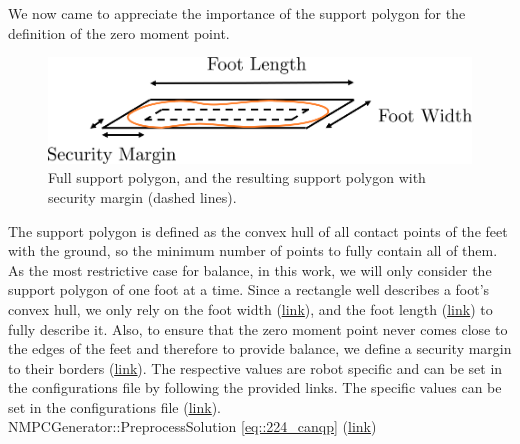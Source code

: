 We now came to appreciate the importance of the support polygon for the definition of the zero moment point. 
\begin{figure}[h!]
	\centering
	\includegraphics[scale=.5]{chapters/02_foundations_for_humanoid_walking/img/support_polygon.png}
	\caption{Full support polygon, and the resulting support polygon with security margin (dashed lines).}
	\label{fig::62_support_polygon}
\end{figure}
The support polygon is defined as the convex hull of all contact points of the feet with the ground, so the minimum number of points to fully contain all of them. As the most restrictive case for balance, in this work, we will only consider the support polygon of one foot at a time. Since a rectangle well describes a foot's convex hull, we only rely on the foot width (\href{https://github.com/mhubii/nmpc_pattern_generator/blob/bc79a6d4f9bcfd3794146355af44429f5b7a9fe0/libs/pattern_generator/configs.yaml#L14}{\underline{link}}), and the foot length (\href{https://github.com/mhubii/nmpc_pattern_generator/blob/bc79a6d4f9bcfd3794146355af44429f5b7a9fe0/libs/pattern_generator/configs.yaml#L15}{\underline{link}}) to fully describe it. Also, to ensure that the zero moment point never comes close to the edges of the feet and therefore to provide balance, we define a security margin to their borders (\href{https://github.com/mhubii/nmpc_pattern_generator/blob/bc79a6d4f9bcfd3794146355af44429f5b7a9fe0/libs/pattern_generator/configs.yaml#L3}{\underline{link}}). The respective values are robot specific and can be set in the configurations file by following the provided links.
The specific values can be set in the configurations file (\href{https://github.com/mhubii/nmpc_pattern_generator/blob/bc79a6d4f9bcfd3794146355af44429f5b7a9fe0/libs/pattern_generator/configs.yaml#L27}{\underline{link}}).
\\
NMPCGenerator::PreprocessSolution \ref{eq::224_canqp}
(\href{https://github.com/mhubii/nmpc_pattern_generator/blob/5a213044c927dc6aac9f7e32ce1e5fb472cd67bb/libs/pattern_generator/src/nmpc_generator.cpp#L145}{\underline{link}})
